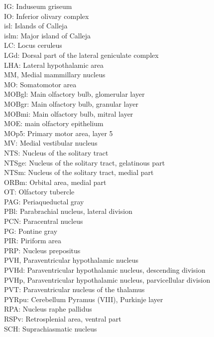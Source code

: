 IG: Induseum griseum \\
IO: Inferior olivary complex\\ 
isl: Islands of Calleja \\
islm: Major island of Calleja\\ 
LC: Locus ceruleus \\
LGd: Dorsal part of the lateral geniculate complex\\ 
LHA: Lateral hypothalamic area \\
MM, Medial mammillary nucleus \\
MO: Somatomotor area\\
MOBgl: Main olfactory bulb, glomerular layer\\ 
MOBgr: Main olfactory bulb, granular layer \\
MOBmi: Main olfactory bulb, mitral layer \\
MOE: main olfactory epithelium \\
MOp5: Primary motor area, layer 5\\ 
MV: Medial vestibular nucleus \\
NTS: Nucleus of the solitary tract\\ 
NTSge: Nucleus of the solitary tract, gelatinous part\\ 
NTSm: Nucleus of the solitary tract, medial part \\
ORBm: Orbital area, medial part \\
OT: Olfactory tubercle \\
PAG: Periaqueductal gray \\
PBl: Parabrachial nucleus, lateral division\\ 
PCN: Paracentral nucleus \\
PG: Pontine gray \\
PIR: Piriform area \\
PRP: Nucleus prepositus \\
PVH, Paraventricular hypothalamic nucleus \\
PVHd: Paraventricular hypothalamic nucleus, descending division \\
PVHp, Paraventricular hypothalamic nucleus, parvicellular division\\ 
PVT: Paraventricular nucleus of the thalamus \\
PYRpu: Cerebellum Pyramus (VIII), Purkinje layer\\ 
RPA: Nucleus raphe pallidus \\
RSPv: Retrosplenial area, ventral part \\
SCH: Suprachiasmatic nucleus \\
